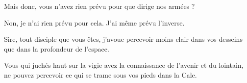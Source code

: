 \begin{drama}
  \alexasspeaks Mais donc, vous n’avez rien prévu pour que \general{} dirige nos armées ?

  \elenaspeaks Non, je n’ai rien prévu pour cela.
               J’ai même prévu l’inverse.

  \alexasspeaks Sire, tout disciple que vous êtes, j’avoue percevoir moins clair dans vos desseins que dans la profondeur de l’espace.

  \elenaspeaks Vous qui juchés haut sur la vigie avez la connaissance de l’avenir et du lointain, ne pouvez percevoir ce qui se trame sous vos pieds dans la Cale.
\end{drama}



\scene




\nopagebreak

